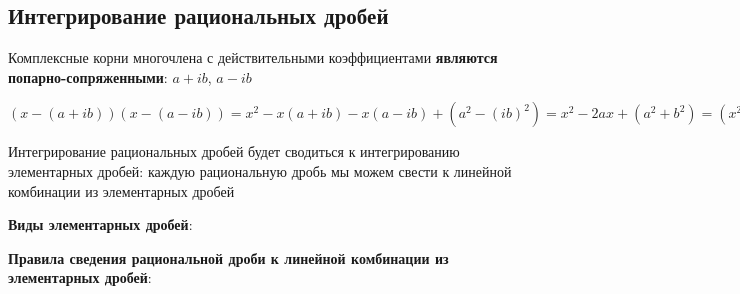 \documentclass{article}
\begin{document}
\subsection{Интегрирование рациональных дробей}

Комплексные корни многочлена с действительными коэффициентами \textbf{являются попарно-сопряженными}: $a + i b$, $a - i b$

$(x - (a + i b))(x - (a - i b)) = x^2 - x (a + i b) - x (a - i b) + (a^2 - (i b)^2) = x^2 - 2 a x + (a^2 + b^2) = (x^2 + p x + q)$

\hfill

Интегрирование рациональных дробей будет сводиться к интегрированию элементарных дробей: каждую рациональную дробь мы можем свести к линейной комбинации из элементарных дробей

\textbf{Виды элементарных дробей}:

\begin{multienumerate}
\end{multienumerate}

\textbf{Правила сведения рациональной дроби к линейной комбинации из элементарных дробей}:
\end{document}
